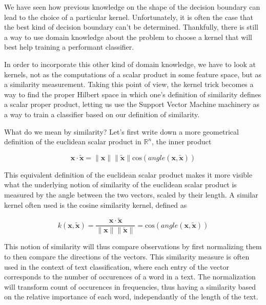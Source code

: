 We have seen how previous knowledge on the shape of the decision boundary can lead to the choice of a particular kernel. Unfortunately, it is often the case that the best kind of decision boundary can't be determined. Thankfully, there is still a way to use domain knowledge about the problem to choose a kernel that will best help training a performant classifier.


In order to incorporate this other kind of domain knowledge, we have to look at kernels, not as the computations of a scalar product in some feature space, but as a similarity measurement. Taking this point of view, the kernel trick becomes a way to find the proper Hilbert space in which one's definition of similarity defines a scalar proper product, letting us use the Support Vector Machine machinery as a way to train a classifier based on our definition of similarity.

What do we mean by similarity? Let's first write down a more geometrical  definition of the euclidean scalar product in $\mathbb{R}^n$, the inner product 

\begin{equation*}
  \mathbf{x} \cdot \mathbf{\tilde{x}} = \|\mathbf{x}\|\|\mathbf{\tilde{x}}\|\text{cos}\left(angle\left(\mathbf{x}, \mathbf{\tilde{x}}\right)
  \right)
\end{equation*}

This equivalent definition of the euclidean scalar product makes it more visible what the underlying notion of similarity of the euclidean scalar product is measured by the angle between the two vectors, scaled by their length. A similar kernel often used is the cosine similarity kernel, defined as

\begin{equation*}
  k(\mathbf{x}, \mathbf{\tilde{x}}) = \frac{\mathbf{x} \cdot \mathbf{\tilde{x}}}{\|\mathbf{x}\|\|\mathbf{\tilde{x}}\|} = \text{cos}\left(angle\left(\mathbf{x}, \mathbf{\tilde{x}}\right)\right)
\end{equation*}

This notion of similarity will thus compare observations by first normalizing them to then compare the directions of the vectors. This similarity measure is often used in the context of text classification, where each entry of the vector corresponds to the number of occurences of a word in a text. The normalization will transform count of occurences in frequencies, thus having a similarity based on the relative importance of each word, independantly of the length of the text.

